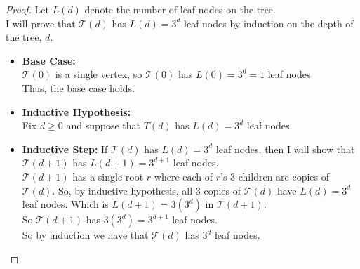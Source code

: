 \documentclass[11pt]{article}
\theoremstyle{definition}
\theoremstyle{definition}
\theoremstyle{definition}
\begin{document}
\begin{proof}

Let $L(d)$ denote the number of leaf nodes on the tree. \\
I will prove that $\mathcal{T}(d)$ has $L(d) = 3^d$ leaf nodes by induction on the depth of the tree, $d$.

\begin{itemize}

\item \textbf{Base Case:}  \\
$\mathcal{T}(0)$ is a single vertex, so $\mathcal{T}(0)$ has $L(0)= 3^0 = 1$ leaf nodes  \\
Thus, the base case holds. \\

\item \textbf{Inductive Hypothesis:} \\
Fix $d \geq 0$ and suppose that $T(d)$ has $L(d)=3^d$ leaf nodes. \\


\item \textbf{Inductive Step:} If $\mathcal{T}(d)$ has $L(d)=3^d$ leaf nodes, then I will show that $\mathcal{T}(d+1)$ has $L(d+1)=3^{d+1}$ leaf nodes. \\

$\mathcal{T}(d+1)$  has a single root $r$ where each of $r$'s 3 children are copies of $\mathcal{T}(d)$. So, by inductive hypothesis, all 3 copies of $\mathcal{T}(d)$ have  $L(d)=3^d$ leaf nodes. Which is $L(d+1)= 3(3^d)$ in $\mathcal{T}(d+1)$. \\
So $\mathcal{T}(d+1)$ has $3(3^d)=3^{d+1}$ leaf nodes. \\

So by induction we have that  $\mathcal{T}(d)$ has $3^{d}$ leaf nodes.
\end{itemize}



\end{proof}
\end{document}
